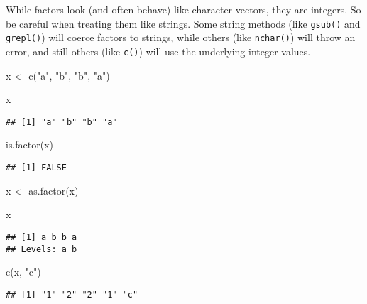 \documentclass[
]{book}
\newenvironment{Shaded}{\begin{snugshade}}{\end{snugshade}}
\newcommand{\FunctionTok}[1]{\textcolor[rgb]{0.00,0.00,0.00}{#1}}
\newcommand{\NormalTok}[1]{#1}
\newcommand{\OtherTok}[1]{\textcolor[rgb]{0.56,0.35,0.01}{#1}}
\newcommand{\StringTok}[1]{\textcolor[rgb]{0.31,0.60,0.02}{#1}}
\begin{document}
While factors look (and often behave) like character vectors, they are integers. So be careful when treating them like strings. Some string methods (like \texttt{gsub()} and \texttt{grepl()}) will coerce factors to strings, while others (like \texttt{nchar()}) will throw an error, and still others (like \texttt{c()}) will use the underlying integer values.

\begin{Shaded}
\begin{Highlighting}[]
\NormalTok{x }\OtherTok{\textless{}{-}} \FunctionTok{c}\NormalTok{(}\StringTok{"a"}\NormalTok{, }\StringTok{"b"}\NormalTok{, }\StringTok{"b"}\NormalTok{, }\StringTok{"a"}\NormalTok{)}

\NormalTok{x}
\end{Highlighting}
\end{Shaded}

\begin{verbatim}
## [1] "a" "b" "b" "a"
\end{verbatim}

\begin{Shaded}
\begin{Highlighting}[]
\FunctionTok{is.factor}\NormalTok{(x)}
\end{Highlighting}
\end{Shaded}

\begin{verbatim}
## [1] FALSE
\end{verbatim}

\begin{Shaded}
\begin{Highlighting}[]
\NormalTok{x }\OtherTok{\textless{}{-}} \FunctionTok{as.factor}\NormalTok{(x)}

\NormalTok{x}
\end{Highlighting}
\end{Shaded}

\begin{verbatim}
## [1] a b b a
## Levels: a b
\end{verbatim}

\begin{Shaded}
\begin{Highlighting}[]
\FunctionTok{c}\NormalTok{(x, }\StringTok{"c"}\NormalTok{)}
\end{Highlighting}
\end{Shaded}

\begin{verbatim}
## [1] "1" "2" "2" "1" "c"
\end{verbatim}
\end{document}
